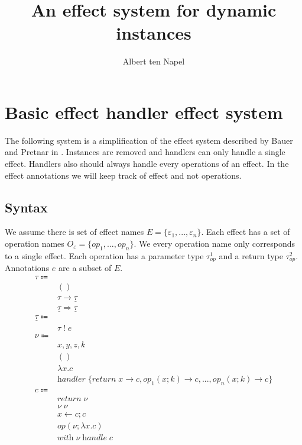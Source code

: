 \documentclass[12pt]{article}
\title{An effect system for dynamic instances}
\author{Albert ten Napel}
\date{}
\newcommand\Eff[0]{E}
\newcommand\eff[0]{\varepsilon}
\newcommand\Op[0]{O}
\newcommand\op[0]{op}
\newcommand\pty[1]{\ty^1_{#1}}
\newcommand\rty[1]{\ty^2_{#1}}
\newcommand\ty[0]{\tau}
\newcommand\tunit[0]{()}
\newcommand\tarr[2]{#1 \rightarrow #2}
\newcommand\thandler[2]{#1 \Rightarrow #2}
\newcommand\cty[0]{\underline{\ty}}
\newcommand\aty[2]{#1 \; ! \; #2}
\newcommand\val[0]{\nu}
\newcommand\vunit[0]{()}
\newcommand\vabs[2]{\lambda #1 . #2}
\newcommand\vhandler[1]{\textit{handler} \; \{#1\}}
\newcommand\vhandlerc[0]{\vhandler{
	\textit{return} \; x \rightarrow \comp,
	\op_1(x ; k) \rightarrow \comp,
	...,
	\op_n(x ; k) \rightarrow \comp
}}
\newcommand\comp[0]{c}
\newcommand\creturn[1]{\textit{return} \; #1}
\newcommand\capp[2]{#1 \; #2}
\newcommand\cdo[3]{#1 \leftarrow #2 ; #3}
\newcommand\cop[4]{#1(#2 ; \lambda #3 . #4)}
\newcommand\chandle[2]{\textit{with} \; #1 \; \textit{handle} \; #2}
\begin{document}
\maketitle

\section{Basic effect handler effect system}

The following system is a simplification of the effect system described by Bauer and Pretnar in \cite{effectsystem}.
Instances are removed and handlers can only handle a single effect.
Handlers also should always handle every operations of an effect.
In the effect annotations we will keep track of effect and not operations.

\subsection{Syntax}
We assume there is set of effect names $\Eff = \{ \eff_1, ..., \eff_n \}$.
Each effect has a set of operation names $\Op_\eff = \{ \op_1, ..., \op_n \}$.
We every operation name only corresponds to a single effect.
Each operation has a parameter type $\pty{\op}$ and a return type $\rty{\op}$.
Annotations $e$ are a subset of $\Eff$.
\\
\begin{align*}
	\ty \Coloneqq 	& 											\tag{value types} \\
									& \tunit								\tag{unit type} \\
									& \tarr{\ty}{\cty}			\tag{type of functions} \\
									& \thandler{\cty}{\cty}	\tag{type of handlers} \\
	\cty \Coloneqq 	& 											\tag{computation types} \\
									& \aty{\ty}{e}					\tag{annotated type} \\
	\val \Coloneqq	&												\tag{values} \\
									& x, y, z, k						\tag{variables} \\
									& \vunit								\tag{unit value} \\
									& \vabs{x}{\comp}				\tag{abstraction} \\
									& \vhandlerc						\tag{handler} \\
	\comp \Coloneqq	&												\tag{computations} \\
									& \creturn{\val}				\tag{return value as computation} \\
									& \capp{\val}{\val}			\tag{application} \\
									& \cdo{x}{\comp}{\comp}	\tag{sequencing} \\
									& \cop{\op}{\val}{x}{\comp}	\tag{operation call} \\
									& \chandle{\val}{\comp}	\tag{handler application} \\
\end{align*}
\end{document}
